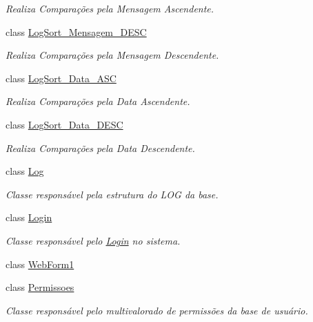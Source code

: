 \begin{DoxyCompactItemize}
\begin{DoxyCompactList}\small\item\em Realiza Comparações pela Mensagem Ascendente. \item\end{DoxyCompactList}\item 
class \hyperlink{class_sistema_r_h_1_1_log_sort___mensagem___d_e_s_c}{LogSort\_\-Mensagem\_\-DESC}
\begin{DoxyCompactList}\small\item\em Realiza Comparações pela Mensagem Descendente. \item\end{DoxyCompactList}\item 
class \hyperlink{class_sistema_r_h_1_1_log_sort___data___a_s_c}{LogSort\_\-Data\_\-ASC}
\begin{DoxyCompactList}\small\item\em Realiza Comparações pela Data Ascendente. \item\end{DoxyCompactList}\item 
class \hyperlink{class_sistema_r_h_1_1_log_sort___data___d_e_s_c}{LogSort\_\-Data\_\-DESC}
\begin{DoxyCompactList}\small\item\em Realiza Comparações pela Data Descendente. \item\end{DoxyCompactList}\item 
class \hyperlink{class_sistema_r_h_1_1_log}{Log}
\begin{DoxyCompactList}\small\item\em Classe responsável pela estrutura do LOG da base. \item\end{DoxyCompactList}\item 
class \hyperlink{class_sistema_r_h_1_1_login}{Login}
\begin{DoxyCompactList}\small\item\em Classe responsável pelo \hyperlink{class_sistema_r_h_1_1_login}{Login} no sistema. \item\end{DoxyCompactList}\item 
class \hyperlink{class_sistema_r_h_1_1_web_form1}{WebForm1}
\item 
class \hyperlink{class_sistema_r_h_1_1_permissoes}{Permissoes}
\begin{DoxyCompactList}\small\item\em Classe responsável pelo multivalorado de permissões da base de usuário. \item\end{DoxyCompactList}\item 

\end{DoxyCompactItemize}
